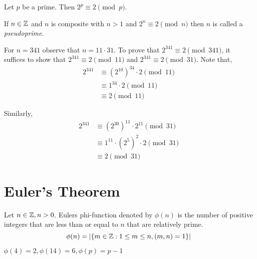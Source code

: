\begin{corollary}
	Let $p$ be a prime. Then $2^{p} \equiv 2 \pmod p$.
\end{corollary}	

\begin{definition}[Pseudoprimes]
	If $n \in \mathbb{Z}$ and $n$ is composite with $n > 1$ and $2^{n} \equiv 2 \pmod n$ then $n$ is called a \emph{pseudoprime}. 
\end{definition}

\begin{eg}
	For $n = 341$ observe that $n = 11 \cdot 31$. To prove that $2^{341} \equiv 2 \pmod {341}$, it suffices to show that $2^{341} \equiv 2 \pmod {11}$ and $2^{341} \equiv 2 \pmod 31$. Note that,
	\begin{align*}
		2^{341} &\equiv (2^{10})^{34} \cdot 2 \pmod {11}\\
			&\equiv 1^{34} \cdot 2 \pmod {11}\\
			&\equiv 2 \pmod {11}
	\end{align*}

	Similarly,
	\begin{align*}
		2^{341} &\equiv (2^{30})^{11} \cdot 2^{11} \pmod {31}\\
			&\equiv 1^{11} \cdot (2^{5})^2 \cdot 2 \pmod {31}\\
			&\equiv 2 \pmod {31}
	\end{align*}

\end{eg}


\section{Euler's Theorem}
\begin{definition}
	Let $n \in \mathbb{Z}, n > 0$. Eulers phi-function denoted by $\phi(n)$ is the number of positive integers that are less than or equal to $n$ that are relatively prime.
	$$
	\phi(n) = \left | \{m \in \mathbb{Z}: 1 \le m \le n, (m,n ) = 1\} \right |
	$$
\end{definition}	

\begin{eg}
	$\phi(4)  = 2, \phi(14) = 6, \phi(p) = p - 1$
\end{eg}

